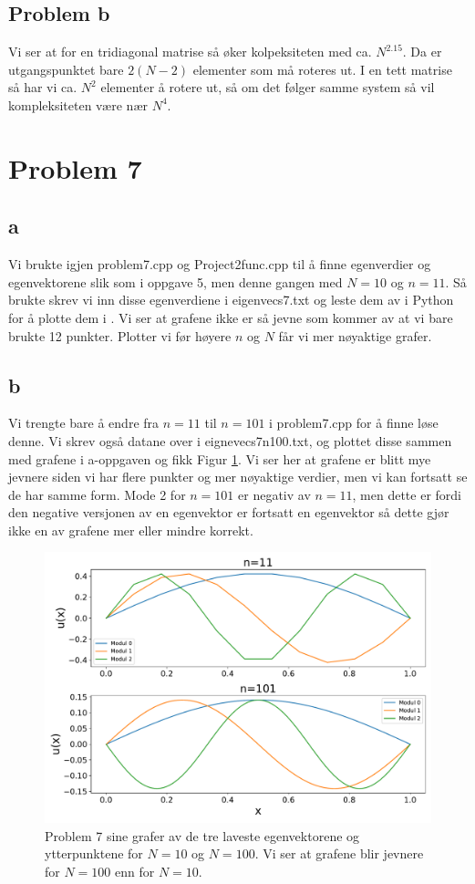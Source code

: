 \documentclass[reprint,english,notitlepage]{revtex4-1}  %
\begin{document}
\subsection*{Problem b}

Vi ser at for en tridiagonal matrise så øker kolpeksiteten med ca. $N^{2.15}$. Da er utgangspunktet bare $2(N-2)$ elementer som må roteres ut. I en tett matrise så har vi ca. $N^2$ elementer å rotere ut, så om det følger samme system så vil kompleksiteten være nær $N^4$.
\section*{Problem 7}
\subsection*{a}
Vi brukte igjen problem7.cpp og Project2func.cpp til å finne egenverdier og egenvektorene slik som i oppgave 5, men denne gangen med $N=10$ og $n=11$. Så brukte skrev vi inn disse egenverdiene i eigenvecs7.txt og leste dem av i Python for å plotte dem i . Vi ser at grafene ikke er så jevne som kommer av at vi bare brukte 12 punkter. Plotter vi før høyere $n$ og $N$ får vi mer nøyaktige grafer.
\subsection*{b}
Vi trengte bare å endre fra $n=11$ til $n=101$ i problem7.cpp for å finne løse denne. Vi skrev også datane over i eignevecs7n100.txt, og plottet disse sammen med grafene i a-oppgaven og fikk Figur \ref{p7graf}. Vi ser her at grafene er blitt mye jevnere siden vi har flere punkter og mer nøyaktige verdier, men vi kan fortsatt se de har samme form. Mode 2 for $n=101$ er negativ av $n=11$, men dette er fordi den negative versjonen av en egenvektor er fortsatt en egenvektor så dette gjør ikke en av grafene mer eller mindre korrekt.
\begin{figure}[H]
	\label{p7graf}
	\includegraphics[scale=0.4]{Images/p7.pdf}
	\caption{Problem 7 sine grafer av de tre laveste egenvektorene og ytterpunktene for $N=10$ og $N=100$. Vi ser at grafene blir jevnere for $N=100$ enn for $N=10$.}
\end{figure}

\end{document}
